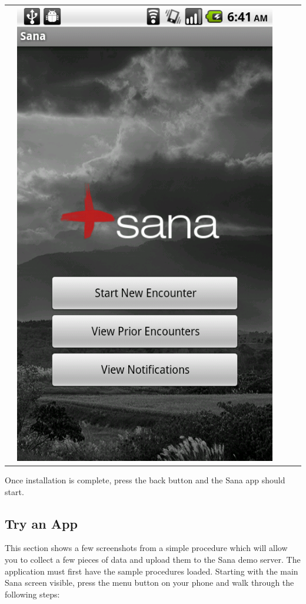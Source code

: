 \documentclass[a4paper,10pt]{article}
\begin{document}
\begin{flushleft}
\begin{tabular}{ c c c c c }
&\includegraphics[scale=0.15,keepaspectratio=true]{sana_splash.png}
\end{tabular}
\end{flushleft}

\noindent Once installation is complete, press the back button and the Sana app
should start. 
\newpage

\subsection{Try an App}This section shows a few screenshots from a simple 
procedure which will allow you to collect a few pieces of data and upload them
to the Sana demo server. The application must first have the sample procedures 
loaded. Starting with the main Sana screen visible, press the menu button on 
your phone and walk through the following steps:
\end{document}
